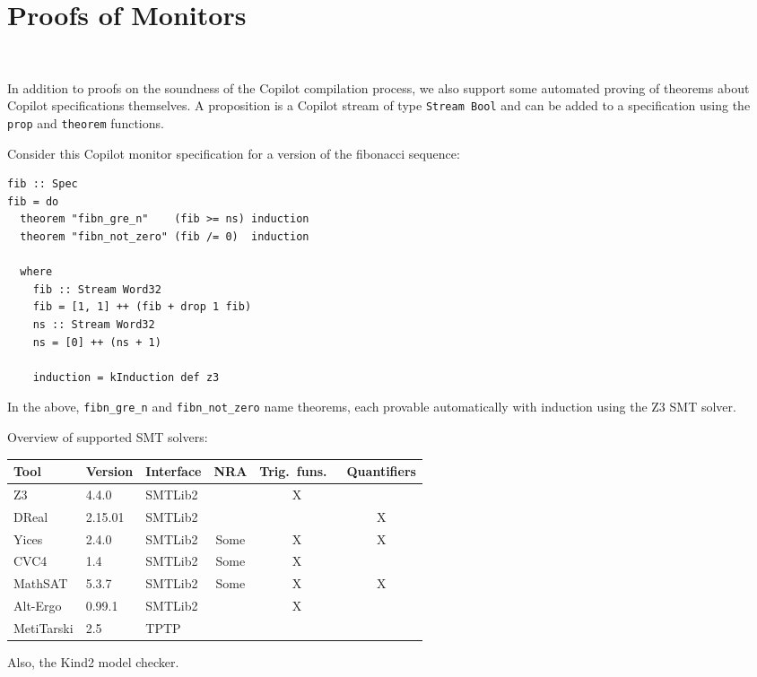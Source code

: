 \section{Proofs of Monitors}~\label{sec:proof}

In addition to proofs on the soundness of the Copilot compilation process, we
also support some automated proving of theorems about Copilot specifications
themselves. A proposition is a Copilot stream of type \lstinline{Stream Bool}
and can be added to a specification using the \lstinline{prop} and
\lstinline{theorem} functions.

Consider this Copilot monitor specification for a version of the fibonacci
sequence:

\begin{lstlisting}
fib :: Spec
fib = do
  theorem "fibn_gre_n"    (fib >= ns) induction
  theorem "fibn_not_zero" (fib /= 0)  induction

  where
    fib :: Stream Word32
    fib = [1, 1] ++ (fib + drop 1 fib)
    ns :: Stream Word32
    ns = [0] ++ (ns + 1)

    induction = kInduction def z3
\end{lstlisting}

In the above, \lstinline{fibn_gre_n} and \lstinline{fibn_not_zero} name
theorems, each provable automatically with induction using the Z3 SMT solver.

Overview of supported SMT solvers:

\newcommand{\Yes}{\checkmark}
\newcommand{\No}{\textsf{X}}
\newcommand{\Kinda}{\textsf{Some}}

\begin{tabular}{lllccc} 
Tool       & Version & Interface & NRA    & Trig.\ funs.\ & Quantifiers \\
\hline
Z3         & 4.4.0   & SMTLib2   & \Yes   & \No           & \Yes \\
DReal      & 2.15.01 & SMTLib2   & \Yes   & \Yes          & \No  \\
Yices      & 2.4.0   & SMTLib2   & \Kinda & \No           & \No  \\
CVC4       & 1.4     & SMTLib2   & \Kinda & \No           & \Yes \\
MathSAT    & 5.3.7   & SMTLib2   & \Kinda & \No           & \No  \\
Alt-Ergo   & 0.99.1  & SMTLib2   & \Yes   & \No           & \Yes \\
MetiTarski & 2.5     & TPTP      & \Yes   & \Yes          & \Yes \\
\end{tabular}

Also, the Kind2 model checker.
